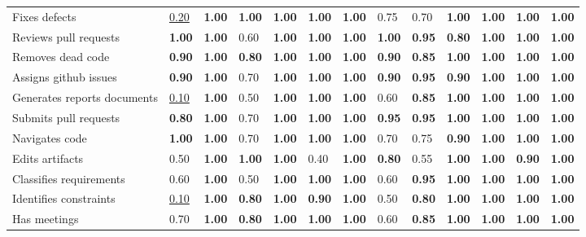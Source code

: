 \begin{tabular}{lllllllllllll}
Fixes defects & \underline{0.20} & \textbf{1.00} & \textbf{1.00} & \textbf{1.00} & \textbf{1.00} & \textbf{1.00} & 0.75 & 0.70 & \textbf{1.00} & \textbf{1.00} & \textbf{1.00} & \textbf{1.00} \\
Reviews pull requests & \textbf{1.00} & \textbf{1.00} & 0.60 & \textbf{1.00} & \textbf{1.00} & \textbf{1.00} & \textbf{1.00} & \textbf{0.95} & \textbf{0.80} & \textbf{1.00} & \textbf{1.00} & \textbf{1.00} \\
Removes dead code & \textbf{0.90} & \textbf{1.00} & \textbf{0.80} & \textbf{1.00} & \textbf{1.00} & \textbf{1.00} & \textbf{0.90} & \textbf{0.85} & \textbf{1.00} & \textbf{1.00} & \textbf{1.00} & \textbf{1.00} \\
Assigns github issues & \textbf{0.90} & \textbf{1.00} & 0.70 & \textbf{1.00} & \textbf{1.00} & \textbf{1.00} & \textbf{0.90} & \textbf{0.95} & \textbf{0.90} & \textbf{1.00} & \textbf{1.00} & \textbf{1.00} \\
Generates reports documents & \underline{0.10} & \textbf{1.00} & 0.50 & \textbf{1.00} & \textbf{1.00} & \textbf{1.00} & 0.60 & \textbf{0.85} & \textbf{1.00} & \textbf{1.00} & \textbf{1.00} & \textbf{1.00} \\
Submits pull requests & \textbf{0.80} & \textbf{1.00} & 0.70 & \textbf{1.00} & \textbf{1.00} & \textbf{1.00} & \textbf{0.95} & \textbf{0.95} & \textbf{1.00} & \textbf{1.00} & \textbf{1.00} & \textbf{1.00} \\
Navigates code & \textbf{1.00} & \textbf{1.00} & 0.70 & \textbf{1.00} & \textbf{1.00} & \textbf{1.00} & 0.70 & 0.75 & \textbf{0.90} & \textbf{1.00} & \textbf{1.00} & \textbf{1.00} \\
Edits artifacts & 0.50 & \textbf{1.00} & \textbf{1.00} & \textbf{1.00} & 0.40 & \textbf{1.00} & \textbf{0.80} & 0.55 & \textbf{1.00} & \textbf{1.00} & \textbf{0.90} & \textbf{1.00} \\
Classifies requirements & 0.60 & \textbf{1.00} & 0.50 & \textbf{1.00} & \textbf{1.00} & \textbf{1.00} & 0.60 & \textbf{0.95} & \textbf{1.00} & \textbf{1.00} & \textbf{1.00} & \textbf{1.00} \\
Identifies constraints & \underline{0.10} & \textbf{1.00} & \textbf{0.80} & \textbf{1.00} & \textbf{0.90} & \textbf{1.00} & 0.50 & \textbf{0.80} & \textbf{1.00} & \textbf{1.00} & \textbf{1.00} & \textbf{1.00} \\
Has meetings & 0.70 & \textbf{1.00} & \textbf{0.80} & \textbf{1.00} & \textbf{1.00} & \textbf{1.00} & 0.60 & \textbf{0.85} & \textbf{1.00} & \textbf{1.00} & \textbf{1.00} & \textbf{1.00} \\

\end{tabular}
